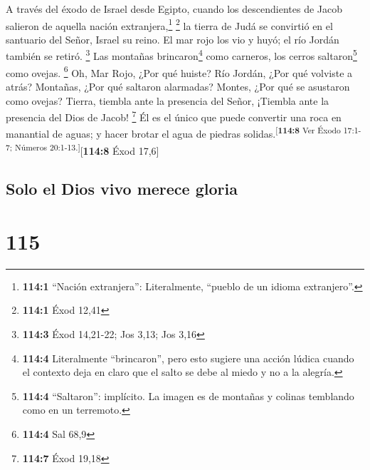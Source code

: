  A través del éxodo de Israel desde Egipto, cuando los
descendientes de Jacob salieron de aquella nación extranjera,\footnote{\textbf{114:1}
  ``Nación extranjera'': Literalmente, ``pueblo de un idioma
  extranjero''.} \footnote{\textbf{114:1} Éxod 12,41}  la
tierra de Judá se convirtió en el santuario del Señor, Israel su reino.
 El mar rojo los vio y huyó; el río Jordán también se
retiró. \footnote{\textbf{114:3} Éxod 14,21-22; Jos 3,13; Jos 3,16}
 Las montañas brincaron\footnote{\textbf{114:4}
  Literalmente ``brincaron'', pero esto sugiere una acción lúdica cuando
  el contexto deja en claro que el salto se debe al miedo y no a la
  alegría.} como carneros, los cerros saltaron\footnote{\textbf{114:4}
  ``Saltaron'': implícito. La imagen es de montañas y colinas temblando
  como en un terremoto.} como ovejas. \footnote{\textbf{114:4} Sal 68,9}
 Oh, Mar Rojo, ¿Por qué huiste? Río Jordán, ¿Por qué
volviste a atrás?  Montañas, ¿Por qué saltaron alarmadas?
Montes, ¿Por qué se asustaron como ovejas?  Tierra,
tiembla ante la presencia del Señor, ¡Tiembla ante la presencia del Dios
de Jacob! \footnote{\textbf{114:7} Éxod 19,18}  Él es el
único que puede convertir una roca en manantial de aguas; y hacer brotar
el agua de piedras solidas.\textsuperscript{{[}\textbf{114:8} Ver Éxodo
17:1-7; Números 20:1-13.{]}}{[}\textbf{114:8} Éxod 17,6{]}

\hypertarget{solo-el-dios-vivo-merece-gloria}{%
\subsection{Solo el Dios vivo merece
gloria}\label{solo-el-dios-vivo-merece-gloria}}

\hypertarget{section-114}{%
\section{115}\label{section-114}}

